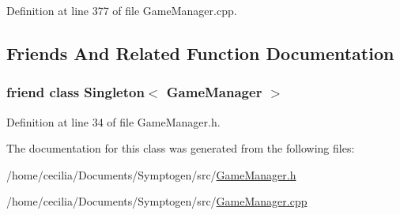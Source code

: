 Definition at line 377 of file Game\-Manager.\-cpp.



\subsection{Friends And Related Function Documentation}
\hypertarget{class_symp_1_1_game_manager_aea7e15ea69de786a42266b0f5cdd4a9c}{
\subsubsection[{Singleton$<$ Game\-Manager $>$}]{\setlength{\rightskip}{0pt plus 5cm}friend class {\bf Singleton}$<$ {\bf Game\-Manager} $>$\hspace{0.3cm}{\ttfamily [friend]}}}\label{class_symp_1_1_game_manager_aea7e15ea69de786a42266b0f5cdd4a9c}


Definition at line 34 of file Game\-Manager.\-h.



The documentation for this class was generated from the following files\-:\begin{DoxyCompactItemize}
\item 
/home/cecilia/\-Documents/\-Symptogen/src/\hyperlink{_game_manager_8h}{Game\-Manager.\-h}\item 
/home/cecilia/\-Documents/\-Symptogen/src/\hyperlink{_game_manager_8cpp}{Game\-Manager.\-cpp}\end{DoxyCompactItemize}
